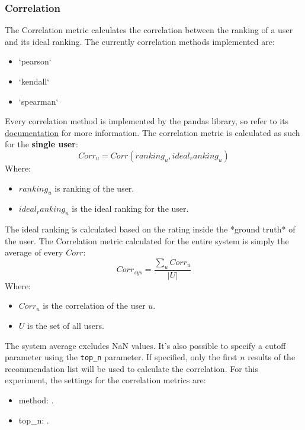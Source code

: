 \documentclass[11pt]{article}
\begin{document}
\subsubsection{Correlation}\label{sec:corr}
The Correlation metric calculates the correlation between the ranking of a user and its ideal ranking.
The currently correlation methods implemented are:
\begin{itemize}
    \item `pearson`
    \item `kendall`
    \item `spearman`
\end{itemize}
\hfill\break
\hfill\break
Every correlation method is implemented by the pandas library, so refer to its
\href{https://pandas.pydata.org/docs/reference/api/pandas.Series.corr.html}{documentation} for more information.
\hfill\break
\hfill\break
The correlation metric is calculated as such for the \textbf{single user}:
\hfill\break
\hfill\break
    \[
        Corr_u = Corr(ranking_u, ideal_ranking_u)
    \]
\hfill\break
\hfill\break
    Where:
\begin{itemize}
    \item $ranking_u$ is ranking of the user.
    \item $ideal_ranking_u$ is the ideal ranking for the user.
\end{itemize}
\hfill\break
\hfill\break
The ideal ranking is calculated based on the rating inside the *ground truth* of the user.
The Correlation metric calculated for the entire system is simply the average of every $Corr$:
\hfill\break
\hfill\break
    \[
        Corr_{sys} = \frac{\sum_{u} Corr_u}{|U|}
    \]
\hfill\break
\hfill\break
    Where:
\begin{itemize}
    \item $Corr_u$ is the correlation of the user $u$.
    \item $U$ is the set of all users.
\end{itemize}
\hfill\break
\hfill\break
The system average excludes NaN values.
It's also possible to specify a cutoff parameter using the \texttt{top\_n} parameter. If specified, only the first
$n$ results of the recommendation list will be used to calculate the correlation.
For this experiment, the settings for the correlation metrics are:
\begin{itemize}
    \item method: .
    \item top_n: .
\end{itemize}
\hfill\break
\hfill\break
\end{document}

